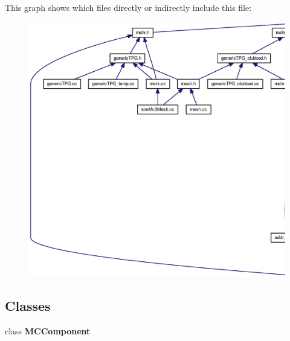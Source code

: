 This graph shows which files directly or indirectly include this file:\nopagebreak
\begin{figure}[H]
\begin{center}
\leavevmode
\includegraphics[width=420pt]{mc__component_8h__dep__incl}
\end{center}
\end{figure}
\subsection*{Classes}
\begin{CompactItemize}
\item 
class {\bf MCComponent}
\end{CompactItemize}
